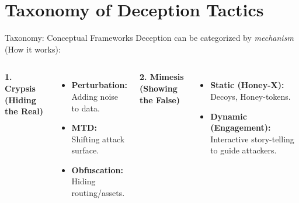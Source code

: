 \documentclass[12pt, aspectratio=169]{beamer}
\begin{document}
\section{Taxonomy of Deception Tactics}
\begin{frame}{Taxonomy: Conceptual Frameworks}
    Deception can be categorized by \textit{mechanism} (How it works):

    \vspace{0.5cm}
    \begin{columns}
        \textbf{1. Crypsis (Hiding the Real)}
        \begin{itemize}
            \item \textbf{Perturbation:} Adding noise to data.
            \item \textbf{MTD:} Shifting attack surface.
            \item \textbf{Obfuscation:} Hiding routing/assets.
        \end{itemize}

        \textbf{2. Mimesis (Showing the False)}
        \begin{itemize}
            \item \textbf{Static (Honey-X):} Decoys, Honey-tokens.
            \item \textbf{Dynamic (Engagement):} Interactive story-telling to guide attackers.
        \end{itemize}
    \end{columns}
\end{frame}
\end{document}
